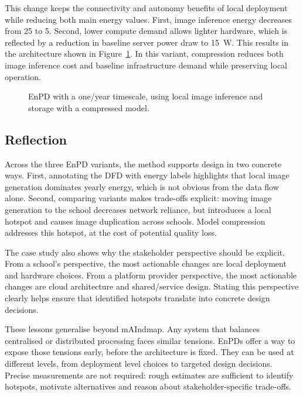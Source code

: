 This change keeps the connectivity and autonomy benefits of local deployment while reducing both main energy values.
First, image inference energy decreases from \qty{25}{\watthour} to \qty{5}{\watthour}.
Second, lower compute demand allows lighter hardware, which is reflected by a reduction in baseline server power draw to \qty{15}{\watt}.
This results in the architecture shown in Figure~\ref{fig:epd-prune}.
In this variant, compression reduces both image inference cost and baseline infrastructure demand while preserving local operation.

\begin{figure}[ht]
  \centering
  \caption{EnPD with a one\-/year timescale, using local image inference and storage with a compressed model.}%
  \label{fig:epd-prune}
\end{figure}

\subsection{Reflection}
Across the three EnPD variants, the method supports design in two concrete ways.
First, annotating the DFD with energy labels highlights that local image generation dominates yearly energy, which is not obvious from the data flow alone.
Second, comparing variants makes trade-offs explicit: moving image generation to the school decreases network reliance, but introduces a local hotspot and causes image duplication across schools.
Model compression addresses this hotspot, at the cost of potential quality loss.

The case study also shows why the stakeholder perspective should be explicit.
From a school's perspective, the most actionable changes are local deployment and hardware choices.
From a platform provider perspective, the most actionable changes are cloud architecture and shared\-/service design.
Stating this perspective clearly helps ensure that identified hotspots translate into concrete design decisions.

These lessons generalise beyond mAIndmap.
Any system that balances centralised or distributed processing faces similar tensions.
EnPDs offer a way to expose those tensions early, before the architecture is fixed.
They can be used at different levels, from deployment level choices to targeted design decisions.
Precise measurements are not required: rough estimates are sufficient to identify hotspots, motivate alternatives and reason about stakeholder-specific trade-offs.

